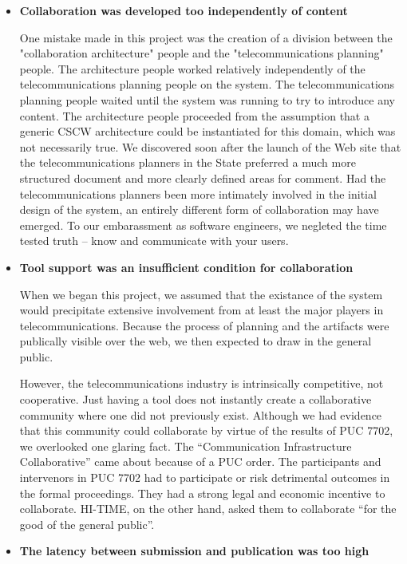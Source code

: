 \begin{itemize}

\item {\bf Collaboration was developed too independently of content}

One mistake made in this project was the creation of a division between the
"collaboration architecture" people and the "telecommunications planning"
people.  The architecture people worked relatively independently of the
telecommunications planning people on the system. The telecommunications
planning people waited until the system was running to try to introduce any
content.  The architecture people proceeded from the assumption that a
generic CSCW architecture could be instantiated for this domain, which was
not necessarily true.  We discovered soon after the launch of the Web site
that the
telecommunications planners in the State preferred a much more structured
document and more clearly defined areas for comment.  Had the
telecommunications planners been more intimately involved in the initial
design of the system, an entirely different form of collaboration may have
emerged.  To our embarassment as software engineers, we negleted the time
tested truth -- know and communicate with your users.

\item {\bf Tool support was an insufficient condition for collaboration}

When we began this project, we assumed that the existance of 
the system would precipitate extensive involvement from at least the 
major players in telecommunications.  Because the process of
planning and the artifacts were publically visible over the web, 
we then expected to draw in the general public. 

However, the telecommunications industry is intrinsically competitive, not
cooperative. Just having a tool does not instantly create a collaborative
community where one did not previously exist.  Although we had evidence
that this community could collaborate by virtue of the results of PUC 7702,
we overlooked one glaring fact.  The ``Communication Infrastructure
Collaborative'' came about because of a PUC order.  The participants and
intervenors in PUC 7702 had to participate or risk detrimental outcomes in
the formal proceedings.  They had a strong legal and economic incentive to
collaborate.  HI-TIME, on the other hand, asked them to collaborate ``for the
good of the general public''.

\item {\bf The latency between submission and publication was too high}


\end{itemize}
